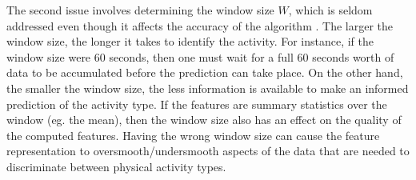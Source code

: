 \documentclass[letterpaper]{article}
\begin{document}
The second issue involves determining  the window size $W$, which is seldom addressed even though it affects the accuracy of the algorithm \cite{trost2012artificial}. The larger the window size, the longer it takes to identify the activity. For instance, if the window size were 60 seconds, then one must wait for a full 60 seconds worth of data to be accumulated before the prediction can take place. On the other hand, the smaller the window size, the less information is available to make an informed prediction of the activity type. If the features are summary statistics over the window (eg. the mean), then the window size also has an effect on the quality of the computed features. Having the wrong window size can cause the feature representation to oversmooth/undersmooth aspects of the data that are needed to discriminate between physical activity types.
\end{document}
